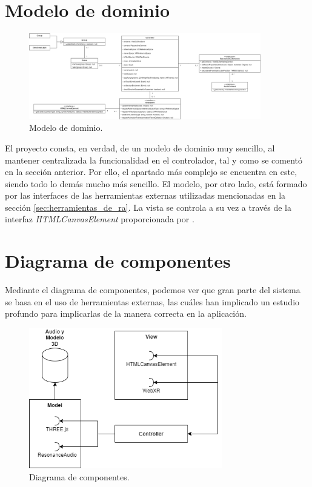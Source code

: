 \documentclass{subfiles}
\begin{document}
        \section{Modelo de dominio}
        \label{sec:modelo_de_dominio}
\begin{figure}[ht]
\centering
\includegraphics[width=0.9\textwidth]{img/analisis_modelo_de_dominio.png}
\caption{Modelo de dominio.}
\label{fig:analisis_modelo_de_dominio}
\end{figure}
        El proyecto \titlename consta, en verdad, de un modelo de dominio muy sencillo, al mantener centralizada la funcionalidad en el controlador, tal y como se comentó en la sección anterior. Por ello, el apartado más complejo se encuentra en este, siendo todo lo demás mucho más sencillo. El modelo, por otro lado, está formado por las interfaces de las herramientas externas utilizadas mencionadas en la sección \ref{sec:herramientas_de_ra}. La vista se controla a su vez a través de la interfaz \textit{HTMLCanvasElement} proporcionada por \js.



        \section{Diagrama de componentes}
        \label{sec:diagrama_de_componentes}

Mediante el diagrama de componentes, podemos ver que gran parte del sistema se basa en el uso de herramientas externas, las cuáles han implicado un estudio profundo para implicarlas de la manera correcta en la aplicación.

\begin{figure}[ht]
\centering
\includegraphics[width=0.75\textwidth]{img/analisis_diagrama_de_componentes.png}
\caption{Diagrama de componentes.}
\label{fig:analisis_diagrama_de_componentes}
\end{figure}
\end{document}
